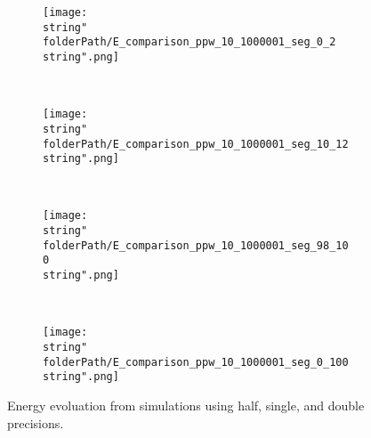 

\renewcommand{\folderPath}{\string"./fig/2D_example/marmousi2_101_401/nvidia_plot_dt_h_10_1p000165939331055e-04_00_dt_s_10_9p999999747378752e-05_00_dt_d_10_1p000000000000000e-04_00/half_chop_D_chop_dx_chop_dt_single_double/\string"}




\begin{figure}[H]
\captionsetup{width=0.95\textwidth,font=footnotesize,labelfont=footnotesize}
\centering
%
\begin{subfigure}[b]{1\textwidth}
%
\centering\texttt{[image: \\string"\\folderPath/E\_comparison\_ppw\_10\_1000001\_seg\_0\_2\\string".png]}
%
\end{subfigure}\hfill
\\[2ex]
%
\begin{subfigure}[b]{1\textwidth}
%
\centering\texttt{[image: \\string"\\folderPath/E\_comparison\_ppw\_10\_1000001\_seg\_10\_12\\string".png]}
%
\end{subfigure}\hfill
\\[2ex]
%
\begin{subfigure}[b]{1\textwidth}
%
\centering\texttt{[image: \\string"\\folderPath/E\_comparison\_ppw\_10\_1000001\_seg\_98\_100\\string".png]}
%
\end{subfigure}\hfill
\\[2ex]
%
\begin{subfigure}[b]{1\textwidth}
%
\centering\texttt{[image: \\string"\\folderPath/E\_comparison\_ppw\_10\_1000001\_seg\_0\_100\\string".png]}
%
\end{subfigure}\hfill
%
\caption{Energy evoluation from simulations using half, single, and double precisions.}
\label{comparison_E_half_compensated_single_double_marmousi2_naive}
\end{figure}


